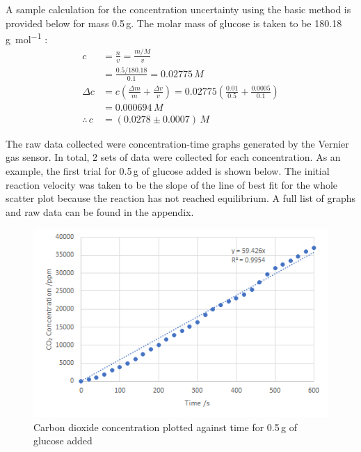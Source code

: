 \documentclass{article}
\begin{document}
A sample calculation for the concentration uncertainty using the basic method is provided below for mass 0.5\,\si{g}. The molar mass of glucose is taken to be 180.18\,\si{g.mol^{-1}} \parencite{ref}:
\begin{align*}
    c &= \frac{n}{v} = \frac{m/M}{v} \\
    &= \frac{0.5/180.18}{0.1} = 0.02775\,\si{M} \\  %
    \Delta c &= c\left(\frac{\Delta m}{m} + \frac{\Delta v}{v}\right) = 0.02775\left(\frac{0.01}{0.5} + \frac{0.0005}{0.1}\right) \\
    &= 0.000694\,\si{M} \\
    \therefore\,c &= (0.0278 \pm 0.0007)\,\si{M}
\end{align*}

The raw data collected were concentration-time graphs generated by the Vernier  gas sensor. In total, 2 sets of data were collected for each concentration. As an example, the first trial for 0.5\,\si{g} of glucose added is shown below. The initial reaction velocity was taken to be the slope of the line of best fit for the whole scatter plot because the reaction has not reached equilibrium. A full list of graphs and raw data can be found in the appendix.  %
\begin{figure}[H]
    \renewcommand{\figurename}{Graph}
    \setcounter{figure}{1}
    \centering
    \includegraphics{figures/graph_02.png}
    \vspace*{-12pt}
    \caption{Carbon dioxide concentration plotted against time for 0.5\,\si{g} of glucose added}
    \label{fig:graph2}
    \renewcommand{\figurename}{Figure}
\end{figure}
\end{document}
